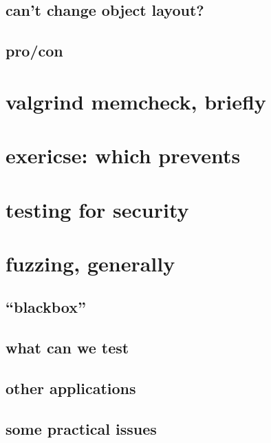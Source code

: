 \subsection{can't change object layout?}


\subsection{pro/con}


\section{valgrind memcheck, briefly}


\section{exericse: which prevents}


\section{testing for security}


\section{fuzzing, generally}


\subsection{``blackbox''}


\subsection{what can we test}


\subsection{other applications}


\subsection{some practical issues}


